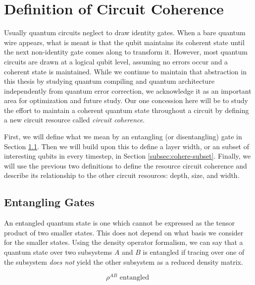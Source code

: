 \section{Definition of Circuit Coherence}
\label{sec:cohere-def}

Usually quantum circuits neglect to draw identity gates. When a bare
quantum wire appears, what is meant is that the qubit maintains its
coherent state until the next non-identity gate comes along to transform it.
However, most quantum circuits are drawn at a logical qubit level,
assuming no errors occur and a coherent state is maintained. While
we continue to maintain that abstraction in this thesis by studying
quantum compiling and quantum architecture independently from
quantum error correction, we acknowledge it as an important area for
optimization and future study. Our one concession here will be to study
the effort to maintain a coherent quantum state throughout a circuit
by defining a new circuit resource called \emph{circuit coherence}.

First, we will define what we mean by an entangling (or disentangling) gate
in Section \ref{subsec:cohere-entangle}. Then we will build upon this
to define a layer width, or an subset of interesting qubits in every
timestep, in Section \ref{subsec:cohere-subset}. Finally, we will use
the previous two definitions to define the resource circuit coherence and
describe its relationship to the other circuit resources: depth, size, and
width. 

\subsection{Entangling Gates}
\label{subsec:cohere-entangle}

An entangled quantum state is one which cannot be expressed as the
tensor product of two smaller states. This does not depend on what basis
we consider for the smaller states. Using the density operator formalism,
we can say that a quantum state over two subsystems $A$ and $B$ is
entangled if tracing over one of the subsystem \emph{does not} yield the other subsystem
as a reduced density matrix.

\begin{equation}
\rho^{AB} \text{ entangled }
\end{equation}

